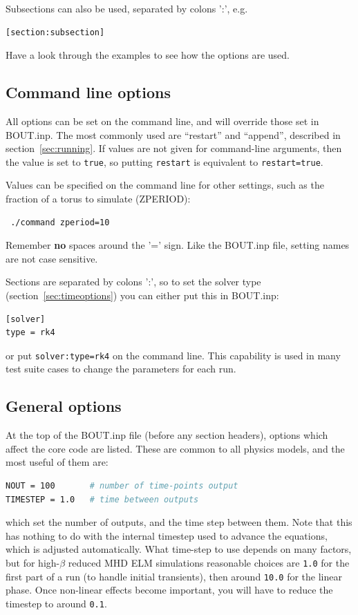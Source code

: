 \documentclass[12pt]{article}
\newcommand{\code}[1]{\texttt{#1}}
\begin{document}
Subsections can also be used, separated by colons ':', e.g.
\begin{lstlisting}[language=bash,numbers=none]
[section:subsection]
\end{lstlisting}

Have a look through the examples to see how the options are used.

\subsection{Command line options}
All options can be set on the command line, and will override those set in BOUT.inp. 
The most commonly used are ``restart'' and ``append'', described in section~\ref{sec:running}.
If values are not given for command-line arguments, then the value is set to \lstinline!true!, so
putting \lstinline!restart! is equivalent to \lstinline!restart=true!. 

Values can be specified on the command line for other settings, such as the fraction of a
torus to simulate (ZPERIOD):
\begin{verbatim}
 ./command zperiod=10
\end{verbatim}
Remember {\bf no} spaces around the '=' sign. Like the BOUT.inp file, setting names are not case sensitive.

Sections are separated by colons ':', so to set the solver type (section~\ref{sec:timeoptions})
you can either put this in BOUT.inp:
\begin{verbatim}
[solver]
type = rk4
\end{verbatim}
or put \lstinline!solver:type=rk4! on the command line. This capability is used in many test suite cases
to change the parameters for each run.

\subsection{General options}

At the top of the BOUT.inp file (before any section headers), 
options which affect the core code are listed. 
These are common to all physics models, and the most useful of them are:
\begin{lstlisting}[language=bash,numbers=none]
NOUT = 100       # number of time-points output
TIMESTEP = 1.0   # time between outputs
\end{lstlisting}
which set the number of outputs, and the time step between them. Note that
this has nothing to do with the internal timestep used to advance the
equations, which is adjusted automatically. What time-step to use depends
on many factors, but for high-$\beta$ reduced MHD
ELM simulations reasonable choices are \code{1.0}
for the first part of a run (to handle initial transients), then around \code{10.0} for the
linear phase. Once non-linear effects become important, you will have to reduce the timestep to
around \code{0.1}.
\end{document}
